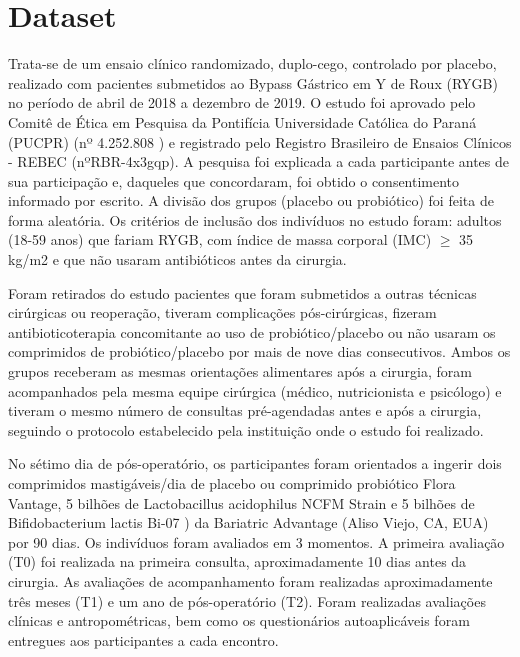 \documentclass[AMA,STIX1COL]{WileyNJD-v2}
\begin{document}
\section{Dataset}\label{sec2}


Trata-se de um ensaio clínico randomizado, duplo-cego, controlado por placebo, realizado com pacientes submetidos ao Bypass Gástrico em Y de Roux (RYGB) no período de abril de 2018 a dezembro de 2019. O estudo foi aprovado pelo Comitê de Ética em Pesquisa da Pontifícia Universidade Católica do Paraná (PUCPR) (nº 4.252.808 ) e registrado pelo Registro Brasileiro de Ensaios Clínicos - REBEC (nºRBR-4x3gqp). A pesquisa foi explicada a cada participante antes de sua participação e, daqueles que concordaram, foi obtido o consentimento informado por escrito. A divisão dos grupos (placebo ou probiótico) foi feita de forma aleatória. Os critérios de inclusão dos indivíduos no estudo foram: adultos (18-59 anos) que fariam RYGB, com índice de massa corporal (IMC) $\geq$ 35 kg/m2 e que não usaram antibióticos antes da cirurgia. 

Foram retirados do estudo pacientes que foram submetidos a outras técnicas cirúrgicas ou reoperação, tiveram complicações pós-cirúrgicas, fizeram antibioticoterapia concomitante ao uso de probiótico/placebo ou não usaram os comprimidos de probiótico/placebo por mais de nove dias consecutivos. Ambos os grupos receberam as mesmas orientações alimentares após a cirurgia, foram acompanhados pela mesma equipe cirúrgica (médico, nutricionista e psicólogo) e tiveram o mesmo número de consultas pré-agendadas antes e após a cirurgia, seguindo o protocolo estabelecido pela instituição onde o estudo foi realizado.

No sétimo dia de pós-operatório, os participantes foram orientados a ingerir dois comprimidos mastigáveis/dia de placebo ou comprimido probiótico Flora Vantage, 5 bilhões de Lactobacillus acidophilus NCFM \textregistered Strain e 5 bilhões de Bifidobacterium lactis Bi-07 \textregistered) da Bariatric Advantage (Aliso Viejo, CA, EUA) por 90 dias. Os indivíduos foram avaliados em 3 momentos. A primeira avaliação (T0) foi realizada na primeira consulta, aproximadamente 10 dias antes da cirurgia. As avaliações de acompanhamento foram realizadas aproximadamente três meses (T1) e um ano de pós-operatório (T2). Foram realizadas avaliações clínicas e antropométricas, bem como os questionários autoaplicáveis foram entregues aos participantes a cada encontro.
\end{document}
